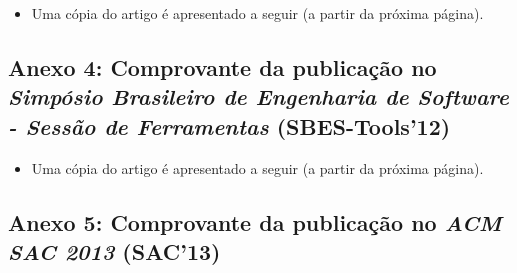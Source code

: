 
\begin{figure}[!h]
 \centering
 \label{fig:comprovante_vmil}
\end{figure}

\begin{itemize}
	\item Uma cópia do artigo é apresentado a seguir (a partir da próxima página).
\end{itemize}
\clearpage



\subsection*{Anexo 4: Comprovante da publicação no \emph{Simpósio Brasileiro de Engenharia de Software - Sessão de Ferramentas} (SBES-Tools'12)} \label{anexo:comprovante_SBES}


\begin{figure}[!h]
 \centering
 \label{fig:comprovante_vmil}
\end{figure}

\begin{itemize}
	\item Uma cópia do artigo é apresentado a seguir (a partir da próxima página).
\end{itemize}
\clearpage



\subsection*{Anexo 5: Comprovante da publicação no \emph{ACM SAC 2013} (SAC'13)} \label{anexo:comprovante_SBES}


